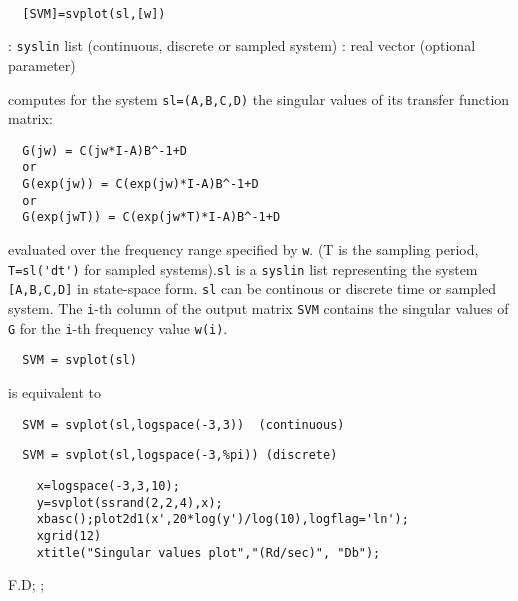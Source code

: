 \begin{mandesc}
   \\ %
\end{mandesc}
\begin{calling_sequence}
\begin{verbatim}
  [SVM]=svplot(sl,[w])  
\end{verbatim}
\end{calling_sequence}
\begin{parameters}
  \begin{varlist}
    : \verb!syslin! list (continuous, discrete or sampled system)
    : real vector (optional parameter)
  \end{varlist}
\end{parameters}
\begin{mandescription}
  computes for the system \verb!sl=(A,B,C,D)!
  the singular values of its transfer function matrix:
\begin{verbatim}
  G(jw) = C(jw*I-A)B^-1+D
  or
  G(exp(jw)) = C(exp(jw)*I-A)B^-1+D
  or
  G(exp(jwT)) = C(exp(jw*T)*I-A)B^-1+D
\end{verbatim}
  evaluated over the frequency range specified by \verb!w!. (T is the sampling
  period, \verb!T=sl('dt')! for sampled systems).\verb!sl! is a \verb!syslin! list representing the system
  \verb![A,B,C,D]! in state-space form. \verb!sl! can be continous or
  discrete time or sampled system.
  The \verb!i!-th column of the output matrix \verb!SVM! contains the singular
  values of \verb!G! for the \verb!i!-th frequency value \verb!w(i)!.
\begin{verbatim}
  SVM = svplot(sl)
\end{verbatim}
  is equivalent to
\begin{verbatim}
  SVM = svplot(sl,logspace(-3,3))  (continuous)
\end{verbatim}
\begin{verbatim}
  SVM = svplot(sl,logspace(-3,%pi)) (discrete)
\end{verbatim}
\end{mandescription}
\begin{examples}
  \begin{Verbatim}
    x=logspace(-3,3,10);
    y=svplot(ssrand(2,2,4),x);
    xbasc();plot2d1(x',20*log(y')/log(10),logflag='ln');
    xgrid(12)
    xtitle("Singular values plot","(Rd/sec)", "Db");
  \end{Verbatim}
\end{examples}
\begin{authors}
  F.D; ;   
\end{authors}
